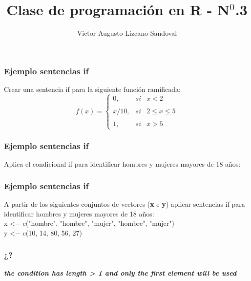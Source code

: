 \documentclass[11pt]{beamer}
\begin{document}
	\author{Victor Augusto Lizcano Sandoval}
	\title{Clase de programación en R - N$^{0}$.3}
	\begin{frame}[plain]
		\maketitle
	\end{frame}
	
	\begin{frame}
		\frametitle{Ejemplo sentencias if}
		
		Crear una sentencia if para la siguiente función ramificada:\\
		
		\begin{equation}
		f(x)= \left\{ \begin{array}{lcc}
		0, &   si  & x <2 \\
		\\ x/10 ,&  si & 2 \leq x \leq 5 \\
		\\ 1, &  si  & x > 5
		\end{array}
		\right.
		\end{equation}
	\end{frame}
	
	\begin{frame}
		\frametitle{Ejemplo sentencias if}
		
		Aplica el condicional if para identificar hombres y mujeres mayores de 18 años:\\
		
	\end{frame}
	
	\begin{frame}
		\frametitle{Ejemplo sentencias if}
		
		A partir de los siguientes conjuntos de vectores (\textbf{x} e  \textbf{y}) aplicar sentencias if para identificar hombres y mujeres mayores de 18 años:\\
		
		x <$-$ c("hombre", "hombre", "mujer", "hombre", "mujer")\\
		y <$-$ c(10, 14, 80, 56, 27)
		
	\end{frame}

	\begin{frame}
		\frametitle{¿?}
		
		\textbf{\textit{the condition has length > 1 and only the first element will be used}}
		
	\end{frame}
\end{document}
